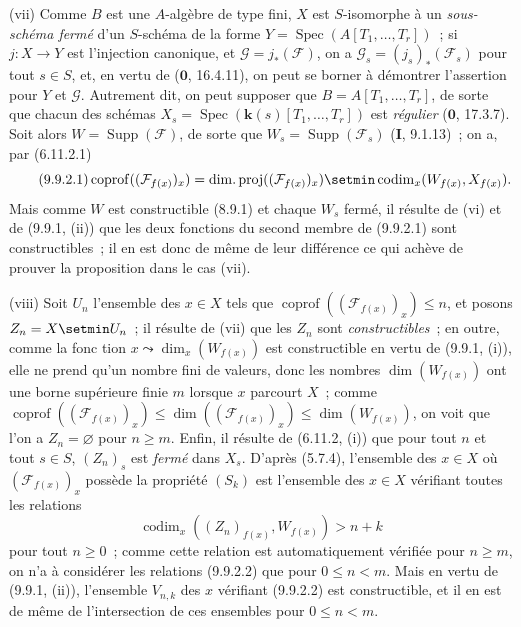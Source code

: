 (vii) Comme $B$ est une $A$-algèbre de type fini, $X$ est $S$-isomorphe à un
\emph{sous-schéma fermé} d'un $S$-schéma de la forme
$Y=\operatorname{Spec}(A[T_1,\ldots,T_r])$~; si $j:X\to Y$ est l'injection
canonique, et $\mathcal G=j_*(\mathcal F)$, on a
$\mathcal G_s=(j_s)_*(\mathcal F_s)$ pour tout $s\in S$, et, en vertu de
($\mathbf 0$, 16.4.11), on peut se borner à démontrer l'assertion pour $Y$ et
$\mathcal G$. Autrement dit, on peut supposer que $B=A[T_1,\ldots,T_r]$, de
sorte que chacun des schémas $X_s=\operatorname{Spec}(\boldsymbol{k}(s)[T_1,\ldots,T_r])$
est \emph{régulier} ($\mathbf 0$, 17.3.7). Soit alors
$W=\operatorname{Supp}(\mathcal F)$, de sorte que
$W_s=\operatorname{Supp}(\mathcal F_s)$ (\textbf{I}, 9.1.13)~; on a, par
(6.11.2.1)
\begin{equation}
\tag{9.9.2.1}
\label{IV.9.9.2.1-fr}
\operatorname{coprof}((\mathcal F_{f(x)})_x)=
\operatorname{dim.proj}((\mathcal F_{f(x)})_x)\setmin
\operatorname{codim}_x(W_{f(x)},X_{f(x)}).
\end{equation}
Mais comme $W$ est constructible (8.9.1) et chaque $W_s$ fermé, il résulte de
(vi) et de (9.9.1, (ii)) que les deux fonctions du second membre de (9.9.2.1)
sont constructibles~; il en est donc de même de leur différence ce qui achève
de prouver la proposition dans le cas (vii).

(viii) Soit $U_n$ l'ensemble des $x\in X$ tels que
$\operatorname{coprof}((\mathcal F_{f(x)})_x)\leq n$, et posons
$Z_n=X\setmin U_n$~; il résulte de (vii) que les $Z_n$ sont \emph{constructibles}~; en outre,
comme
la fonc%
tion $x\leadsto\dim_x(W_{f(x)})$ est constructible en vertu de
(9.9.1, (i)), elle ne prend qu'un nombre fini de valeurs, donc les nombres
$\dim(W_{f(x)})$ ont une borne supérieure finie $m$ lorsque $x$ parcourt $X$~;
comme
$\operatorname{coprof}((\mathcal F_{f(x)})_x)\leq
\dim((\mathcal F_{f(x)})_x)\leq\dim(W_{f(x)})$, on voit que l'on a
$Z_n=\varnothing$ pour $n\geq m$. Enfin, il résulte de (6.11.2, (i)) que pour
tout $n$ et tout $s\in S$, $(Z_n)_s$ est \emph{fermé} dans $X_s$. D'après
(5.7.4), l'ensemble des $x\in X$ où $(\mathcal F_{f(x)})_x$ possède la
propriété $(S_k)$ est l'ensemble des $x\in X$ vérifiant toutes les relations
\begin{equation}
\tag{9.9.2.2}
\label{IV.9.9.2.2-fr}
\operatorname{codim}_x((Z_n)_{f(x)},W_{f(x)})>n+k
\end{equation}
pour tout $n\geq0$~; comme cette relation est automatiquement vérifiée pour
$n\geq m$, on n'a à considérer les relations (9.9.2.2) que pour $0\leq n<m$.
Mais en vertu de (9.9.1, (ii)), l'ensemble $V_{n,k}$ des $x$ vérifiant (9.9.2.2)
est constructible, et il en est de même de l'intersection de ces ensembles pour
$0\leq n<m$.

